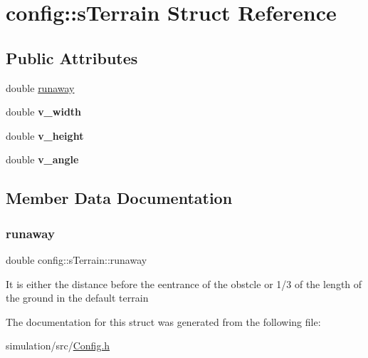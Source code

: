 \hypertarget{structconfig_1_1s_terrain}{}\section{config\+:\+:s\+Terrain Struct Reference}
\label{structconfig_1_1s_terrain}
\subsection*{Public Attributes}
\begin{DoxyCompactItemize}
\item 
double \mbox{\hyperlink{structconfig_1_1s_terrain_ad6c30d8e675a81113ff3e5af46e636ac}{runaway}}
\item 
\mbox{\label{structconfig_1_1s_terrain_a6a8545cc6a2c5a232f5e60971a92cbb0}} 
double {\bfseries v\+\_\+width}
\item 
\mbox{\label{structconfig_1_1s_terrain_aee6358b6e85e5599aa76af2e0f765ca0}} 
double {\bfseries v\+\_\+height}
\item 
\mbox{\label{structconfig_1_1s_terrain_a8e98646a0b5acab7df066a6859459b2e}} 
double {\bfseries v\+\_\+angle}
\end{DoxyCompactItemize}


\subsection{Member Data Documentation}
\mbox{\label{structconfig_1_1s_terrain_ad6c30d8e675a81113ff3e5af46e636ac}} 
\subsubsection{\texorpdfstring{runaway}{runaway}}
{\footnotesize\ttfamily double config\+::s\+Terrain\+::runaway}

It is either the distance before the eentrance of the obstcle or 1/3 of the length of the ground in the default terrain 

The documentation for this struct was generated from the following file\+:\begin{DoxyCompactItemize}
\item 
simulation/src/\mbox{\hyperlink{_config_8h}{Config.\+h}}\end{DoxyCompactItemize}
